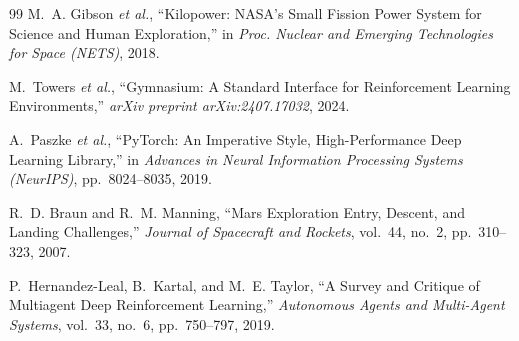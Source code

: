 \documentclass[11pt,a4paper]{article}
\begin{document}
\begin{thebibliography}{99}
M.~A. Gibson \textit{et al.},
``Kilopower: NASA's Small Fission Power System for Science and Human Exploration,''
in \textit{Proc. Nuclear and Emerging Technologies for Space (NETS)}, 2018.

M.~Towers \textit{et al.},
``Gymnasium: A Standard Interface for Reinforcement Learning Environments,''
\textit{arXiv preprint arXiv:2407.17032}, 2024.

A.~Paszke \textit{et al.},
``PyTorch: An Imperative Style, High-Performance Deep Learning Library,''
in \textit{Advances in Neural Information Processing Systems (NeurIPS)}, pp.~8024--8035, 2019.

R.~D. Braun and R.~M. Manning,
``Mars Exploration Entry, Descent, and Landing Challenges,''
\textit{Journal of Spacecraft and Rockets}, vol.~44, no.~2, pp.~310--323, 2007.

P.~Hernandez-Leal, B.~Kartal, and M.~E. Taylor,
``A Survey and Critique of Multiagent Deep Reinforcement Learning,''
\textit{Autonomous Agents and Multi-Agent Systems}, vol.~33, no.~6, pp.~750--797, 2019.

\end{thebibliography}
\end{document}
